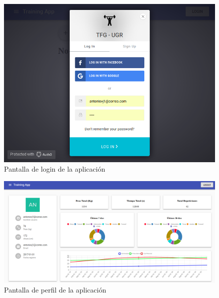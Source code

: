 \begin{figure}
  \begin{center}
    \includegraphics[width=\textwidth]{imagenes/login.png}
    \caption{Pantalla de login de la aplicación}
    \label{fig:login}
  \end{center}
\end{figure}

\begin{figure}
  \begin{center}
    \includegraphics[width=\textwidth]{imagenes/perfil.png}
    \caption{Pantalla de perfil de la aplicación}
    \label{fig:perfil}
  \end{center}
\end{figure}


